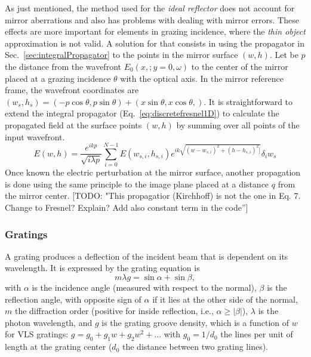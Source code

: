 \documentclass{iucr}              %
\newcommand{\todo}[1]{{\color{red}[TODO: "#1'']}}
\begin{document}
As just mentioned, the method used for the {\it ideal reflector} does not account for mirror aberrations and also has problems with dealing with mirror errors. These effects are more important for elements in grazing incidence, where the {\it thin object} approximation is not valid. A solution for that consists in using the propagator in Sec.~\ref{sec:integralPropagator} to the points in the mirror surface $(w,h)$. Let be $p$ the distance from the wavefront $E_0(x,;y=0,\omega)$ to the center of the mirror placed at a grazing incidence $\theta$ with the optical axis. In the mirror reference frame, the wavefront coordinates are $(w_s, h_s) =(-p \cos \theta, p \sin \theta) + (x \sin \theta, x \cos \theta,)$. It is straightforward to extend the integral propagator (Eq.~\ref{eq:discretefresnel1D}) to calculate the propagated field at the surface points $(w,h)$ by summing over all points of the input wavefront. 
\begin{equation}\label{eq:grazingPropagator}
 E(w,h) = \frac {e^{i k p }}{ \sqrt{i \lambda p}} \sum_{i=0}^{N-1}  E(w_{s,i},h_{s,i}) e^{i k \sqrt{(w - w_{s,i})^2 + (h - h_{s,i})^2]}} \delta_i w_s
\end{equation}
Once known the electric perturbation at the mirror surface, another propagation is done using the same principle to the image plane placed at a distance $q$ from the  mirror center. \todo{This propagatior (Kirchhoff) is not the one in Eq. 7. Change to Fresnel? Explain? Add also constant term in the code}

\subsubsection{Gratings}
\label{sec:grating}

A grating produces a deflection of the incident beam that is dependent on its wavelength. It is expressed by the grating equation is
\begin{equation}
    m \lambda g = \sin\alpha + \sin\beta,
\end{equation}
with $\alpha$ is the incidence angle (measured with respect to the normal), $\beta$ is the reflection angle, with opposite sign of $\alpha$ if it lies at the other side of the normal, $m$ the diffraction order (positive for inside reflection, i.e., $\alpha \ge |\beta|$),
$\lambda$ is the photon wavelength, and $g$ is the grating groove density, which is a function of $w$ for VLS gratings: $g = g_0 + g_1 w + g_2 w^2 + ...$ with $g_0 = 1/d_0$ the lines per unit of length at the grating center ($d_0$ the distance between two grating lines).
\end{document}
